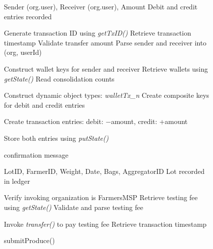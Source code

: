 \documentclass[12pt]{article}
\begin{document}
		\begin{figure}[h]
		\centering
		\caption{Transfer and Produce Submission Mechanisms}
		\label{fig:transfer_submit}
		
		\begin{minipage}[t]{0.48\linewidth}
			\vspace{0pt}
			\centering
			\begin{algorithm}[H]
				\caption{transfer() (MVCC-Safe)}
				\begin{algorithmic}[1]
					
					\Require Sender (org.user), Receiver (org.user), Amount
					\Ensure Debit and credit entries recorded
					
					\State Generate transaction ID using \textit{getTxID()}
					\State Retrieve transaction timestamp
					\State Validate transfer amount
					\State Parse sender and receiver into (org, userId)
					
					\State Construct wallet keys for sender and receiver
					\State Retrieve wallets using \textit{getState()}
					\State Read consolidation counts
					
					\State Construct dynamic object types: \textit{walletTx\_n}
					\State Create composite keys for debit and credit entries
					
					\State Create transaction entries:
					\State \quad debit: $-$amount, credit: +amount
					
					\State Store both entries using \textit{putState()}
					
					\State \Return confirmation message
					
				\end{algorithmic}
			\end{algorithm}
		\end{minipage}
		\hfill
		\begin{minipage}[t]{0.48\linewidth}
			\vspace{0pt}
			\centering
			\begin{algorithm}[H]
				\caption{submitProduce()}
				\begin{algorithmic}[1]
					
					\Require LotID, FarmerID, Weight, Date, Bags, AggregatorID
					\Ensure Lot recorded in ledger
					
					\State Verify invoking organization is FarmersMSP
					\State Retrieve testing fee using \textit{getState()}
					\State Validate and parse testing fee
					
					\State Invoke \textit{transfer()} to pay testing fee
					\State Retrieve transaction timestamp
					

\end{algorithmic}
\end{algorithm}
\end{minipage}
\end{figure}
\end{document}
